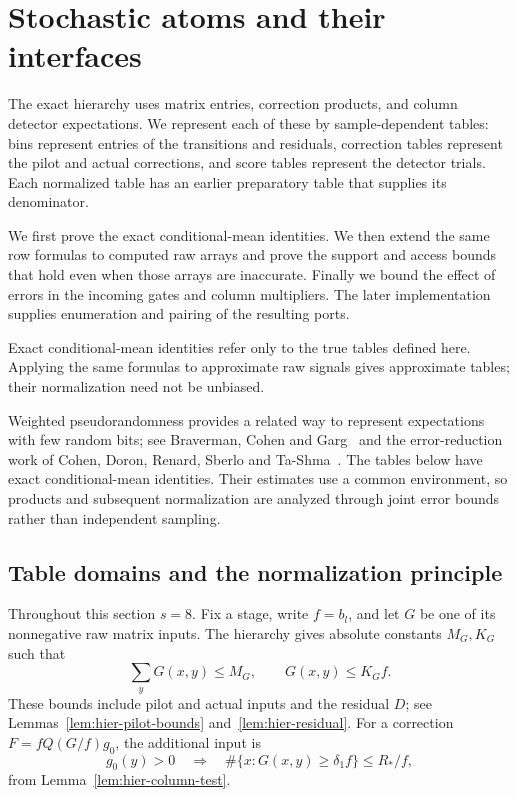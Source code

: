 \section{Stochastic atoms and their interfaces}
\label{sec:atom}

The exact hierarchy uses matrix entries, correction products, and column
detector expectations.  We represent each of these by sample-dependent
tables: bins represent entries of the transitions and residuals,
correction tables represent the pilot and actual corrections, and score
tables represent the detector trials.  Each normalized table has an
earlier preparatory table that supplies its denominator.

We first prove the exact conditional-mean identities.  We then extend the
same row formulas to computed raw arrays and prove the support and access
bounds that hold even when those arrays are inaccurate.  Finally we bound
the effect of errors in the incoming gates and column multipliers.  The
later implementation supplies enumeration and pairing of the resulting
ports.

Exact conditional-mean identities refer only to the true tables defined
here.  Applying the same formulas to approximate raw signals gives
approximate tables; their normalization need not be unbiased.

Weighted pseudorandomness provides a related way to represent expectations
with few random bits; see Braverman, Cohen and Garg~\cite{BravermanCohenGarg2020}
and the error-reduction work of Cohen, Doron, Renard, Sberlo and
Ta-Shma~\cite{CohenDoronRenardSberloTaShma2021}. The tables below have
exact conditional-mean identities. Their estimates use a common
environment, so products and subsequent normalization are analyzed
through joint error bounds rather than independent sampling.

\subsection{Table domains and the normalization principle}

Throughout this section $s=8$.  Fix a stage, write $f=b_l$, and let $G$ be
one of its nonnegative raw matrix inputs.  The hierarchy gives absolute
constants $M_G,K_G$ such that
\begin{equation}
 \sum_y G(x,y)\le M_G,\qquad G(x,y)\le K_G f.
 \label{eq:atom-input-bounds}
\end{equation}
These bounds include pilot and actual inputs and the residual $D$; see
Lemmas~\ref{lem:hier-pilot-bounds} and~\ref{lem:hier-residual}.
For a correction $F=fQ(G/f)g_0$, the additional input is
\begin{equation}
 g_0(y)>0\quad\Longrightarrow\quad
 \#\{x:G(x,y)\ge\delta_1 f\}\le R_*/f,
 \label{eq:atom-column-input}
\end{equation}
from Lemma~\ref{lem:hier-column-test}.

